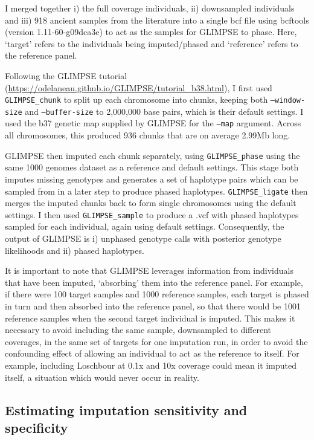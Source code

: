 I merged together i) the full coverage individuals, ii) downsampled individuals and iii) 918 ancient samples from the literature into a single bcf file using bcftools (version 1.11-60-g09dca3e) \cite{li2011statistical} to act as the samples for GLIMPSE to phase. Here, `target' refers to the individuals being imputed/phased and `reference' refers to the reference panel.  

Following the GLIMPSE tutorial (\url{https://odelaneau.github.io/GLIMPSE/tutorial_b38.html}), I first used \texttt{GLIMPSE\_chunk} to split up each  chromosome into chunks, keeping both \texttt{--window-size} and \texttt{--buffer-size} to 2,000,000 base pairs, which is their default settings. I used the b37 genetic map supplied by GLIMPSE for the \texttt{--map} argument. Across all chromosomes, this produced 936 chunks that are on average 2.99Mb long. 

GLIMPSE then imputed each chunk separately, using \texttt{GLIMPSE\_phase} using the same 1000 genomes dataset as a reference and default settings. This stage both imputes missing genotypes and generates a set of haplotype pairs which can be sampled from in a later step to produce phased haplotypes. \texttt{GLIMPSE\_ligate} then merges the imputed chunks back to form single chromosomes using the default settings. I then used \texttt{GLIMPSE\_sample} to produce a .vcf with phased haplotypes sampled for each individual, again using default settings. Consequently, the output of GLIMPSE is i) unphased genotype calls with posterior genotype likelihoods and ii) phased haplotypes.

It is important to note that GLIMPSE leverages information from individuals that have been imputed, `absorbing' them into the reference panel. For example, if there were 100 target samples and 1000 reference samples, each target is phased in turn and then absorbed into the reference panel, so that there would be 1001 reference samples when the second target individual is imputed. This makes it necessary to avoid including the same sample, downsampled to different coverages, in the same set of targets for one imputation run, in order to avoid the confounding effect of allowing an individual to act as the reference to itself. For example, including Loschbour at 0.1x and 10x coverage could mean it imputed itself, a situation which would never occur in reality. 


\subsection{Estimating imputation sensitivity and specificity}

